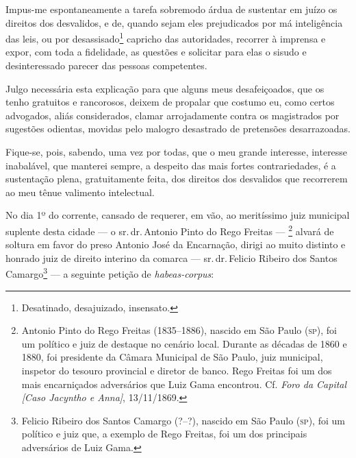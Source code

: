 Impus-me espontaneamente a tarefa sobremodo árdua de sustentar em juízo
os direitos dos desvalidos, e de, quando sejam eles prejudicados por má
inteligência das leis, ou por desassisado\footnote{Desatinado,
  desajuizado, insensato.} capricho das autoridades, recorrer à imprensa
e expor, com toda a fidelidade, as questões e solicitar para elas o
sisudo e desinteressado parecer das pessoas competentes.

Julgo necessária esta explicação para que alguns meus desafeiçoados, que
os tenho gratuitos e rancorosos, deixem de propalar que costumo eu, como
certos advogados, aliás considerados, clamar arrojadamente contra os
magistrados por sugestões odientas, movidas pelo malogro desastrado de
pretensões desarrazoadas.

Fique-se, pois, sabendo, uma vez por todas, que o meu grande interesse,
interesse inabalável, que manterei sempre, a despeito das mais fortes
contrariedades, é a sustentação plena, gratuitamente feita, dos direitos
dos desvalidos que recorrerem ao meu tênue valimento intelectual.

\asterisc{}

No dia 1º do corrente, cansado de requerer, em vão, ao meritíssimo juiz
municipal suplente desta cidade --- o sr.\,dr.\,Antonio Pinto do Rego
Freitas --- \footnote{Antonio Pinto do Rego Freitas (1835--1886), nascido em
  São Paulo (\textsc{sp}), foi um político e juiz de destaque no cenário local.
  Durante as décadas de 1860 e 1880, foi presidente da Câmara Municipal
  de São Paulo, juiz municipal, inspetor do tesouro provincial e diretor
  de banco. Rego Freitas foi um dos mais encarniçados adversários que
  Luiz Gama encontrou. Cf. \emph{Foro da Capital {[}Caso Jacyntho e
  Anna{]}}, 13/11/1869.\label{rego}} alvará de soltura em favor do preso Antonio
José da Encarnação, dirigi ao muito distinto e honrado juiz de direito
interino da comarca --- sr.\,dr.\,Felicio Ribeiro dos Santos
Camargo\footnote{Felicio Ribeiro dos Santos Camargo (?--?), nascido em
  São Paulo (\textsc{sp}), foi um político e juiz que, a exemplo de Rego Freitas,
  foi um dos principais adversários de Luiz Gama.\label{felicio}} --- a seguinte petição
de \emph{habeas-corpus}:

